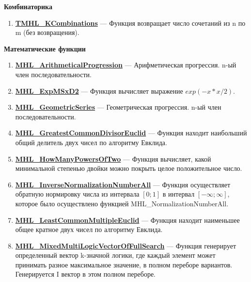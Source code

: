 \documentclass[a4paper,12pt]{article}
\begin{document}
\textbf{Комбинаторика}
\begin{enumerate}

\item \textbf{\hyperref[TMHL_KCombinations]{TMHL\_KCombinations}} --- Функция возвращает число сочетаний из n по m (без возвращения).

\end{enumerate}

\textbf{Математические функции}
\begin{enumerate}

\item \textbf{\hyperref[MHL_ArithmeticalProgression]{MHL\_ArithmeticalProgression}} --- Арифметическая прогрессия. n-ый член последовательности.

\item \textbf{\hyperref[MHL_ExpMSxD2]{MHL\_ExpMSxD2}} --- Функция вычисляет выражение $exp(-x*x/2)$.

\item \textbf{\hyperref[MHL_GeometricSeries]{MHL\_GeometricSeries}} --- Геометрическая прогрессия. n-ый член последовательности.

\item \textbf{\hyperref[MHL_GreatestCommonDivisorEuclid]{MHL\_GreatestCommonDivisorEuclid}} --- Функция находит наибольший общий делитель двух чисел по алгоритму Евклида.

\item \textbf{\hyperref[MHL_HowManyPowersOfTwo]{MHL\_HowManyPowersOfTwo}} --- Функция вычисляет, какой минимальной степенью двойки можно покрыть целое положительное число.

\item \textbf{\hyperref[MHL_InverseNormalizationNumberAll]{MHL\_InverseNormalizationNumberAll}} --- Функция осуществляет обратную нормировку числа из интервала $\left[0;1\right] $  в интервал $\left[-\infty;\infty \right] $, которое было осуществлено функцией MHL\_NormalizationNumberAll.

\item \textbf{\hyperref[MHL_LeastCommonMultipleEuclid]{MHL\_LeastCommonMultipleEuclid}} --- Функция находит наименьшее общее кратное двух чисел по алгоритму Евклида.

\item \textbf{\hyperref[MHL_MixedMultiLogicVectorOfFullSearch]{MHL\_MixedMultiLogicVectorOfFullSearch}} --- Функция генерирует определенный вектор k-значной логики, где каждый элемент может принимать разное максимальное значение, в полном переборе вариантов. Генерируется I вектор в этом полном переборе.


\end{enumerate}
\end{document}

